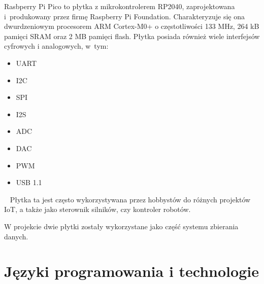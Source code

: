Rasbperry Pi Pico to płytka z mikrokontrolerem RP2040, zaprojektowana i~produkowany przez firmę Raspberry Pi Foundation. Charakteryzuje się ona dwurdzeniowym procesorem ARM Cortex-M0+ o częstotliwości 133 MHz, 264 kB pamięci SRAM oraz 2 MB pamięci flash. Płytka posiada również wiele interfejsów cyfrowych i analogowych, w~tym:
\begin{itemize}
    \item UART
    \item I2C
    \item SPI
    \item I2S
    \item ADC
    \item DAC
    \item PWM
    \item USB 1.1
\end{itemize}~\cite{PICO:datasheet,PICO:doc}
Płytka ta jest często wykorzystywana przez hobbystów do różnych projektów IoT, a także jako sterownik silników, czy kontroler robotów.\cite{PICO:doc}

W projekcie dwie płytki zostały wykorzystane jako część systemu zbierania danych.


\section{Języki programowania i technologie}
